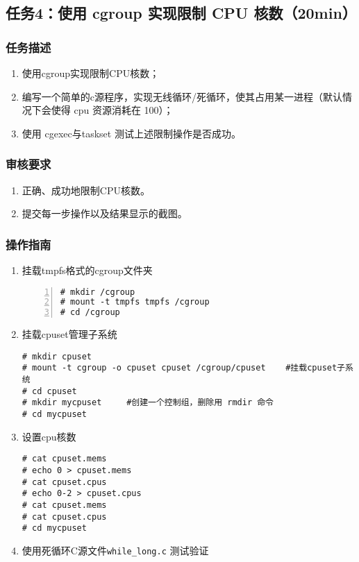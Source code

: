 \documentclass{article}
\begin{document}
\newpage

\subsection{任务4：使用 cgroup 实现限制 CPU 核数（20min）}

\subsubsection{任务描述}
\begin{enumerate}
	\item 使用cgroup实现限制CPU核数；
	\item 编写一个简单的c源程序，实现无线循环/死循环，使其占用某一进程（默认情况下会使得 cpu 资源消耗在 100）；
	\item 使用 cgexec与taskset 测试上述限制操作是否成功。
\end{enumerate}

\subsubsection{审核要求}
\begin{enumerate}
	\item 正确、成功地限制CPU核数。
	\item 提交每一步操作以及结果显示的截图。
\end{enumerate}

\subsubsection{操作指南}
\begin{enumerate}
	\item 挂载tmpfs格式的cgroup文件夹
	      \begin{lstlisting}[numbers=left]
# mkdir /cgroup
# mount -t tmpfs tmpfs /cgroup
# cd /cgroup
\end{lstlisting}
	\item 挂载cpuset管理子系统
	      \begin{lstlisting}
# mkdir cpuset
# mount -t cgroup -o cpuset cpuset /cgroup/cpuset    #挂载cpuset子系统
# cd cpuset
# mkdir mycpuset     #创建一个控制组，删除用 rmdir 命令
# cd mycpuset
\end{lstlisting}
	\item 设置cpu核数
	      \begin{lstlisting}
# cat cpuset.mems
# echo 0 > cpuset.mems
# cat cpuset.cpus
# echo 0-2 > cpuset.cpus
# cat cpuset.mems
# cat cpuset.cpus
# cd mycpuset
\end{lstlisting}
	\item 使用死循环C源文件\verb|while_long.c| 测试验证
\end{enumerate}
\end{document}
